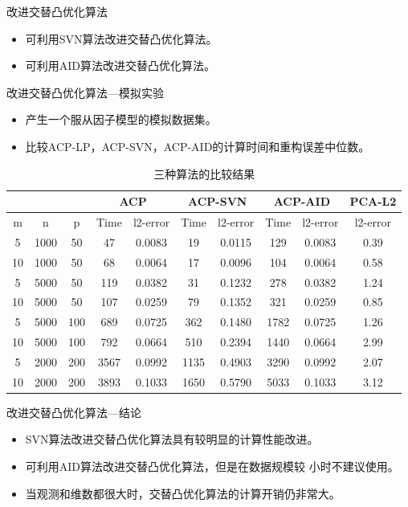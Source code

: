 \begin{frame}{改进交替凸优化算法}
    \begin{itemize}
        \item 可利用SVN算法改进交替凸优化算法。
        \item 可利用AID算法改进交替凸优化算法。
    \end{itemize} 
\end{frame}

\begin{frame}{改进交替凸优化算法—模拟实验}
    \begin{itemize}
        \item 产生一个服从因子模型的模拟数据集。
        \item 比较ACP-LP，ACP-SVN，ACP-AID的计算时间和重构误差中位数。
    \end{itemize} 
    \begin{table}[H]
        \tiny
        \centering
        \caption{三种算法的比较结果}
        \label{three-l1-pca}
        \begin{tabular}{@{}cccccccccc@{}}
        \toprule
           &      &     & \multicolumn{2}{c}{ACP} & \multicolumn{2}{c}{ACP-SVN} & \multicolumn{2}{c}{ACP-AID} & PCA-L2   \\ \midrule
        m  & n    & p   & Time     & l2-error     & Time       & l2-error       & Time       & l2-error       & l2-error \\ \midrule
        5  & 1000  & 50  & 47       & 0.0083       & 19         & 0.0115         & 129        & 0.0083         & 0.39     \\
        10 & 1000  & 50  & 68       & 0.0064       & 17         & 0.0096         & 104        & 0.0064         & 0.58     \\
        5  & 5000 & 50  & 119      & 0.0382       & 31         & 0.1232         & 278        & 0.0382         & 1.24     \\
        10 & 5000 & 50  & 107      & 0.0259       & 79         & 0.1352         & 321        & 0.0259         & 0.85     \\
        5  & 5000 & 100 & 689      & 0.0725       & 362        & 0.1480         & 1782       & 0.0725         & 1.26     \\
        10 & 5000 & 100 & 792      & 0.0664       & 510        & 0.2394         & 1440       & 0.0664         & 2.99     \\
        5  & 2000  & 200 & 3567     & 0.0992       & 1135       & 0.4903         & 3290       & 0.0992         & 2.07     \\
        10 & 2000  & 200 & 3893     & 0.1033       & 1650       & 0.5790         & 5033       & 0.1033         & 3.12     \\ \bottomrule
        \end{tabular}
    \end{table}
\end{frame}

\begin{frame}{改进交替凸优化算法—结论}
    \begin{itemize}
        \item SVN算法改进交替凸优化算法具有较明显的计算性能改进。
        \item 可利用AID算法改进交替凸优化算法，但是在数据规模较
        小时不建议使用。
        \item 当观测和维数都很大时，交替凸优化算法的计算开销仍非常大。
    \end{itemize} 
\end{frame}
